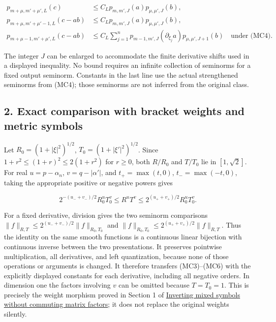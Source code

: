 \documentclass[
  11pt,
]{article}
\begin{document}
\[
\begin{aligned}
p_{m+\mu,m'+\mu',L}(c)
&\leq C_Lp_{m,m',J}(a)p_{\mu,\mu',J}(b),\\
p_{m+\mu,m'+\mu'-1,L}(c-ab)
&\leq C_Lp_{m,m',J}(a)p_{\mu,\mu',J}(b),\\
p_{m+\mu-1,m'+\mu',L}(c-ab)
&\leq C_L\sum_{j=1}^n p_{m-1,m',J}(\partial_{\xi_j}a)
                         p_{\mu,\mu',J+1}(b)
\quad\text{under (MC4)}.
\end{aligned}
\tag{MC6}
\]

The integer \(J\) can be enlarged to accommodate the finite derivative
shifts used in a displayed inequality. No bound requires an infinite
collection of seminorms for a fixed output seminorm. Constants in the
last line use the actual strengthened seminorms from (MC4); those
seminorms are not inferred from the original class.

\subsection{2. Exact comparison with bracket weights and metric
symbols}\label{exact-comparison-with-bracket-weights-and-metric-symbols}

Let \(R_0=(1+|\xi|^2)^{1/2}\), \(T_0=(1+|\xi'|^2)^{1/2}\). Since
\(1+r^2\leq(1+r)^2\leq2(1+r^2)\) for \(r\geq0\), both \(R/R_0\) and
\(T/T_0\) lie in \([1,\sqrt2]\). For real \(u=p-\alpha_n\),
\(v=q-|\alpha'|\), and \(t_+=\max(t,0)\), \(t_-=\max(-t,0)\), taking the
appropriate positive or negative powers gives

\[
2^{-(u_-+v_-)/2}R_0^uT_0^v
\leq R^uT^v
\leq2^{(u_++v_+)/2}R_0^uT_0^v.
\tag{MC7}
\]

For a fixed derivative, division gives the two seminorm comparisons
\(\|f\|_{R,T}\leq2^{(u_-+v_-)/2}\|f\|_{R_0,T_0}\) and
\(\|f\|_{R_0,T_0}\leq2^{(u_++v_+)/2}\|f\|_{R,T}\). Thus the identity on
the same smooth functions is a continuous linear bijection with
continuous inverse between the two presentations. It preserves pointwise
multiplication, all derivatives, and left quantization, because none of
those operations or arguments is changed. It therefore transfers
(MC3)--(MC6) with the explicitly displayed constants for each
derivative, including all negative orders. In dimension one the factors
involving \(v\) can be omitted because \(T=T_0=1\). This is precisely
the weight morphism proved in Section 1 of
\href{mixed-symbol-inversion.pdf}{Inverting mixed symbols without
commuting matrix factors}; it does not replace the original weights
silently.
\end{document}
